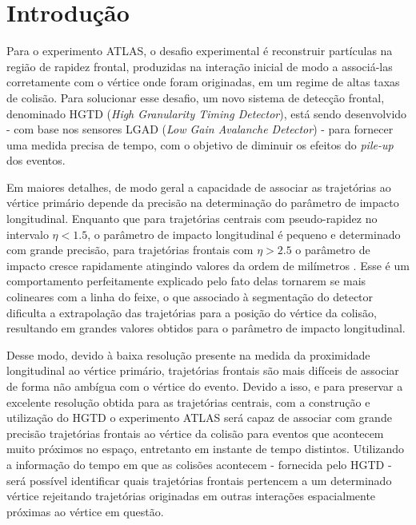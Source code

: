\chapter{Introdução}

Para o experimento ATLAS, o desafio experimental é reconstruir partículas na região de rapidez frontal, produzidas na interação inicial de modo a associá-las corretamente com o vértice onde foram originadas, em um regime de altas taxas de colisão. Para solucionar esse desafio, um novo sistema de detecção frontal, denominado HGTD ({\it High Granularity Timing Detector}), está sendo desenvolvido - com base nos sensores LGAD ({\it Low Gain Avalanche Detector}) - para fornecer uma medida precisa de tempo, com o objetivo de diminuir os efeitos do {\it pile-up} dos eventos. 

Em maiores detalhes, de modo geral a capacidade de associar as trajetórias ao vértice primário depende da precisão na determinação do parâmetro de impacto longitudinal. Enquanto que para trajetórias centrais com pseudo-rapidez no intervalo $\eta<1.5$, o parâmetro de impacto longitudinal é pequeno e determinado com grande precisão, para trajetórias frontais com $\eta>2.5$ o parâmetro de impacto cresce rapidamente atingindo valores da ordem de milímetros \cite{tdr}. Esse é um comportamento perfeitamente explicado pelo fato delas tornarem se mais colineares com a linha do feixe, o que associado à segmentação do detector dificulta a extrapolação das trajetórias para a posição do vértice da colisão, resultando em grandes valores obtidos para o parâmetro de impacto longitudinal.

Desse modo, devido à baixa resolução presente na medida da proximidade longitudinal ao vértice primário, trajetórias frontais são mais difíceis de associar de forma não ambígua com o vértice do evento. Devido a isso, e para preservar a excelente resolução obtida para as trajetórias centrais, com a construção e utilização do HGTD o experimento ATLAS será capaz de associar com grande precisão trajetórias frontais ao vértice da colisão para eventos que acontecem muito próximos no espaço, entretanto em instante de tempo distintos. Utilizando a informação do tempo em que as colisões acontecem - fornecida pelo HGTD - será possível identificar quais trajetórias frontais pertencem a um determinado vértice rejeitando trajetórias originadas em outras interações espacialmente próximas ao vértice em questão. 


